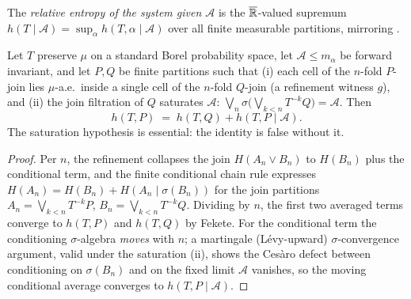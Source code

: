 \begin{definition}\label{condKsEntropy}
  \leanok
  The \emph{relative entropy of the system given \(\mathcal A\)} is the \(\overline{\mathbb{R}}\)-valued
  supremum
  \(h(T\mid\mathcal A) = \sup_\alpha h(T,\alpha\mid\mathcal A)\)
  over all finite measurable partitions, mirroring .
\end{definition}

\begin{theorem}\label{abramovRokhlin_partition}
  \leanok
  Let \(T\) preserve \(\mu\) on a standard Borel probability space, let
  \(\mathcal A\le m_\alpha\) be forward invariant, and let \(P, Q\) be finite partitions such
  that (i) each cell of the \(n\)-fold \(P\)-join lies \(\mu\)-a.e.\ inside a single cell of the
  \(n\)-fold \(Q\)-join (a refinement witness \(g\)), and (ii) the join filtration of \(Q\)
  saturates \(\mathcal A\): \(\bigvee_n \sigma\bigl(\bigvee_{k<n}T^{-k}Q\bigr)=\mathcal A\). Then
  \[
    h(T,P) \;=\; h(T,Q) + h(T,P \mid \mathcal A).
  \]
  The saturation hypothesis is essential: the identity is false without it.
\end{theorem}
\begin{proof}\leanok
  Per \(n\), the refinement collapses the join \(H(A_n\vee B_n)\) to \(H(B_n)\) plus the
  conditional term, and the finite conditional chain rule expresses
  \(H(A_n) = H(B_n) + H(A_n\mid\sigma(B_n))\) for the join partitions
  \(A_n=\bigvee_{k<n}T^{-k}P\), \(B_n=\bigvee_{k<n}T^{-k}Q\). Dividing by \(n\), the first two
  averaged terms converge to \(h(T,P)\) and \(h(T,Q)\) by Fekete. For the conditional term the
  conditioning \(\sigma\)-algebra \emph{moves} with \(n\); a martingale (L\'evy-upward)
  \(\sigma\)-convergence argument, valid under the saturation (ii), shows the Ces\`aro defect
  between conditioning on \(\sigma(B_n)\) and on the fixed limit \(\mathcal A\) vanishes, so the
  moving conditional average converges to \(h(T,P\mid\mathcal A)\).
\end{proof}

